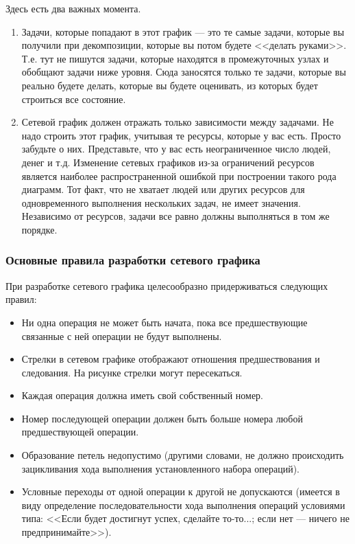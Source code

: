 \documentclass{../../text-style}
\begin{document}
Здесь есть два важных момента.

\begin{enumerate}
    \item Задачи, которые попадают в этот график --- это те самые задачи, которые вы получили при декомпозиции, которые вы потом будете <<делать руками>>. Т.е. тут не пишутся задачи, которые находятся в промежуточных узлах и обобщают задачи ниже уровня. Сюда заносятся только те задачи, которые вы реально будете делать, которые вы будете оценивать, из которых будет строиться все состояние.
    \item Сетевой график должен отражать только зависимости между задачами. Не надо строить этот график, учитывая те ресурсы, которые у вас есть. Просто забудьте о них. Представьте, что у вас есть неограниченное число людей, денег и т.д. Изменение сетевых графиков из-за ограничений ресурсов является наиболее распространенной ошибкой при построении такого рода диаграмм. Тот факт, что не хватает людей или других ресурсов для одновременного выполнения нескольких задач, не имеет значения. Независимо от ресурсов, задачи все равно должны выполняться в том же порядке.
\end{enumerate}

\subsubsection{Основные правила разработки сетевого графика}

При разработке сетевого графика целесообразно придерживаться следующих правил:

\begin{itemize}
    \item Ни одна операция не может быть начата, пока все предшествующие связанные с ней операции не будут выполнены.
    \item Стрелки в сетевом графике отображают отношения предшествования и следования. На рисунке стрелки могут пересекаться.
    \item Каждая операция должна иметь свой собственный номер.
    \item Номер последующей операции должен быть больше номера любой предшествующей операции.
    \item Образование петель недопустимо (другими словами, не должно происходить зацикливания хода выполнения установленного набора операций).
    \item Условные переходы от одной операции к другой не допускаются (имеется в виду определение последовательности хода выполнения операций условиями типа: <<Если будет достигнут успех, сделайте то-то...; если нет --- ничего не предпринимайте>>).
\end{itemize}
\end{document}
